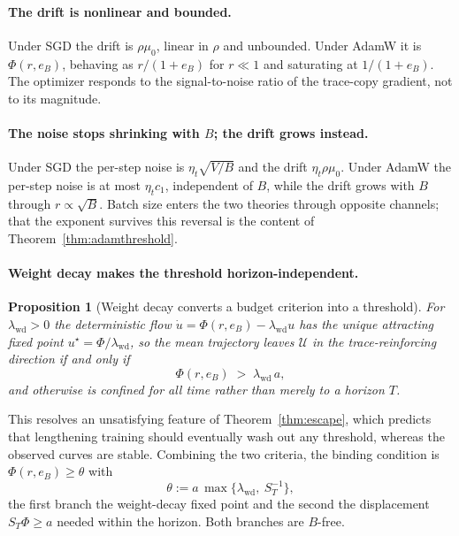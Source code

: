 \documentclass{article}
\theoremstyle{plain}
\newtheorem{proposition}{Proposition}
\theoremstyle{definition}
\theoremstyle{remark}
\newcommand{\1}{\mathbf{1}}
\newcommand{\cU}{\mathcal{U}}
\newcommand{\wdc}{\mathrm{wd}}
\begin{document}
\paragraph{The drift is nonlinear and bounded.}
Under SGD the drift is $\rho\mu_0$, linear in $\rho$ and unbounded. Under AdamW
it is $\Phi(r,e_B)$, behaving as $r/(1+e_B)$ for $r\ll1$ and saturating at
$1/(1+e_B)$. The optimizer responds to the signal-to-noise ratio of the
trace-copy gradient, not to its magnitude.

\paragraph{The noise stops shrinking with $B$; the drift grows instead.}
Under SGD the per-step noise is $\eta_t\sqrt{V/B}$ and the drift
$\eta_t\rho\mu_0$. Under AdamW the per-step noise is at most $\eta_tc_1$,
independent of $B$, while the drift grows with $B$ through $r\propto\sqrt B$.
Batch size enters the two theories through opposite channels; that the exponent
survives this reversal is the content of Theorem~\ref{thm:adamthreshold}.

\paragraph{Weight decay makes the threshold horizon-independent.}
\begin{proposition}[Weight decay converts a budget criterion into a threshold]
\label{prop:wd}
For $\lambda_\wdc > 0$ the deterministic flow
$\dot u = \Phi(r,e_B)-\lambda_\wdc u$ has the unique attracting fixed point
$u^\star = \Phi/\lambda_\wdc$, so the mean trajectory leaves $\cU$ in the
trace-reinforcing direction if and only if
\begin{equation}
\label{eq:wdcriterion}
\Phi(r,e_B) \;>\; \lambda_\wdc\,a ,
\end{equation}
and otherwise is confined for all time rather than merely to a horizon $T$.
\end{proposition}

This resolves an unsatisfying feature of Theorem~\ref{thm:escape}, which predicts
that lengthening training should eventually wash out any threshold, whereas the
observed curves are stable. Combining the two criteria, the binding condition is
$\Phi(r,e_B)\ge\theta$ with
\begin{equation}
\label{eq:thetadef}
\theta := a\,\max\{\lambda_\wdc,\ S_T^{-1}\},
\end{equation}
the first branch the weight-decay fixed point and the second the displacement
$S_T\Phi\ge a$ needed within the horizon. Both branches are $B$-free.
\end{document}
